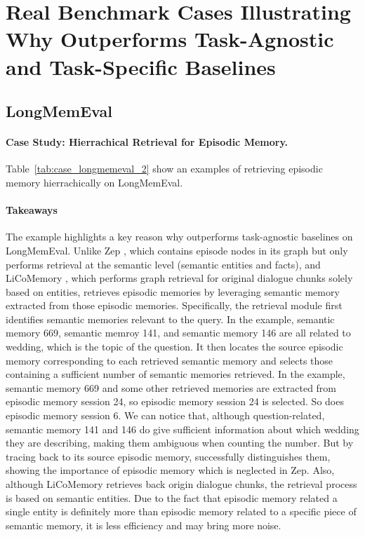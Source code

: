 \section{Real Benchmark Cases Illustrating Why \plugmem Outperforms Task-Agnostic and Task-Specific Baselines}
\label{app:real_benchmark_cases}
\subsection{LongMemEval}

\paragraph{Case Study: Hierrachical Retrieval for Episodic Memory.}
Table~\ref{tab:case_longmemeval_2} show an examples of \plugmem retrieving episodic memory hierrachically on LongMemEval. 


\paragraph{Takeaways}
The example highlights a key reason why \plugmem outperforms task-agnostic baselines on LongMemEval. Unlike Zep \cite{rasmussen2025zeptemporalknowledgegraph}, which contains episode nodes in its graph but only performs retrieval at the semantic level (semantic entities and facts), and LiCoMemory \cite{huang2026licomemorylightweightcognitiveagentic}, which performs graph retrieval for original dialogue chunks solely based on entities, \plugmem retrieves episodic memories by leveraging semantic memory extracted from those episodic memories. Specifically, the retrieval module first identifies semantic memories relevant to the query. In the example, semantic memory 669, semantic memroy 141, and semantic memory 146 are all related to wedding, which is the topic of the question. It then locates the source episodic memory corresponding to each retrieved semantic memory and selects those containing a sufficient number of semantic memories retrieved. In the example, semantic memory 669 and some other retrieved memories are extracted from episodic memory session 24, so episodic memory session 24 is selected. So does episodic memory session 6. We can notice that, although question-related, semantic memory 141 and 146 do give sufficient information about which wedding they are describing, making them ambiguous when counting the number. But by tracing back to its source episodic memory, \plugmem successfully distinguishes them, showing the importance of episodic memory which is neglected in Zep. Also, although LiCoMemory retrieves back origin dialogue chunks, the retrieval process is based on semantic entities. Due to the fact that episodic memory related a single entity is definitely more than episodic memory related to a specific piece of semantic memory, it is less efficiency and may bring more noise. 

